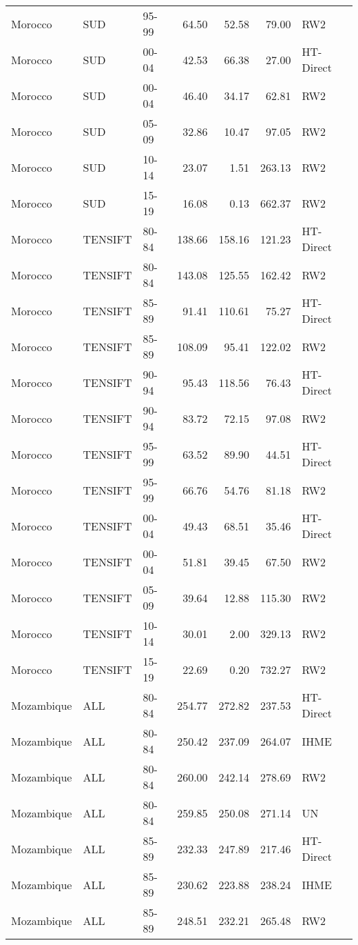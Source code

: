\begin{longtable}{lllrrrl}
  Morocco & SUD & 95-99 & 64.50 & 52.58 & 79.00 & RW2 \\ 
  Morocco & SUD & 00-04 & 42.53 & 66.38 & 27.00 & HT-Direct \\ 
  Morocco & SUD & 00-04 & 46.40 & 34.17 & 62.81 & RW2 \\ 
  Morocco & SUD & 05-09 & 32.86 & 10.47 & 97.05 & RW2 \\ 
  Morocco & SUD & 10-14 & 23.07 & 1.51 & 263.13 & RW2 \\ 
  Morocco & SUD & 15-19 & 16.08 & 0.13 & 662.37 & RW2 \\ 
  Morocco & TENSIFT & 80-84 & 138.66 & 158.16 & 121.23 & HT-Direct \\ 
  Morocco & TENSIFT & 80-84 & 143.08 & 125.55 & 162.42 & RW2 \\ 
  Morocco & TENSIFT & 85-89 & 91.41 & 110.61 & 75.27 & HT-Direct \\ 
  Morocco & TENSIFT & 85-89 & 108.09 & 95.41 & 122.02 & RW2 \\ 
  Morocco & TENSIFT & 90-94 & 95.43 & 118.56 & 76.43 & HT-Direct \\ 
  Morocco & TENSIFT & 90-94 & 83.72 & 72.15 & 97.08 & RW2 \\ 
  Morocco & TENSIFT & 95-99 & 63.52 & 89.90 & 44.51 & HT-Direct \\ 
  Morocco & TENSIFT & 95-99 & 66.76 & 54.76 & 81.18 & RW2 \\ 
  Morocco & TENSIFT & 00-04 & 49.43 & 68.51 & 35.46 & HT-Direct \\ 
  Morocco & TENSIFT & 00-04 & 51.81 & 39.45 & 67.50 & RW2 \\ 
  Morocco & TENSIFT & 05-09 & 39.64 & 12.88 & 115.30 & RW2 \\ 
  Morocco & TENSIFT & 10-14 & 30.01 & 2.00 & 329.13 & RW2 \\ 
  Morocco & TENSIFT & 15-19 & 22.69 & 0.20 & 732.27 & RW2 \\ 
  Mozambique & ALL & 80-84 & 254.77 & 272.82 & 237.53 & HT-Direct \\ 
  Mozambique & ALL & 80-84 & 250.42 & 237.09 & 264.07 & IHME \\ 
  Mozambique & ALL & 80-84 & 260.00 & 242.14 & 278.69 & RW2 \\ 
  Mozambique & ALL & 80-84 & 259.85 & 250.08 & 271.14 & UN \\ 
  Mozambique & ALL & 85-89 & 232.33 & 247.89 & 217.46 & HT-Direct \\ 
  Mozambique & ALL & 85-89 & 230.62 & 223.88 & 238.24 & IHME \\ 
  Mozambique & ALL & 85-89 & 248.51 & 232.21 & 265.48 & RW2 \\ 

\end{longtable}

